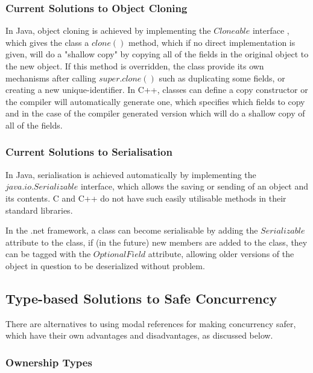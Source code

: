 \documentclass[pdftex,12pt,a4paper]{article}
\begin{document}
\subsubsection{Current Solutions to Object Cloning}

In Java, object cloning is achieved by implementing the $Cloneable$ interface \cite{java-cloneable}, which gives the class a $clone()$ method, which if no direct implementation is given, will do a "shallow copy" by copying all of the fields in the original object to the new object.
If this method is overridden, the class provide its own mechanisms after calling $super.clone()$ such as duplicating some fields, or creating a new unique-identifier.
In C++, classes can define a copy constructor or the compiler will automatically generate one\cite{ansi:03:c++}, which specifies which fields to copy and in the case of the compiler generated version which will do a shallow copy of all of the fields. 

\subsubsection{Current Solutions to Serialisation}

In Java, serialisation is achieved automatically by implementing the $java.io.Serializable$ \cite{java-serializable} interface, which allows the saving or sending of an object and its contents.
C and C++ do not have such easily utilisable methods in their standard libraries.

In the .net framework, a class can become serialisable by adding the $Serializable$\cite{net-serializable} attribute to the class, if (in the future) new members are added to the class, they can be tagged with the $OptionalField$ attribute\cite{net-optional}, allowing older versions of the object in question to be deserialized without problem.

\newpage
\subsection{Type-based Solutions to Safe Concurrency}

There are alternatives to using modal references for making concurrency safer, which have their own advantages and disadvantages, as discussed below.

\subsubsection{Ownership Types}
\end{document}
